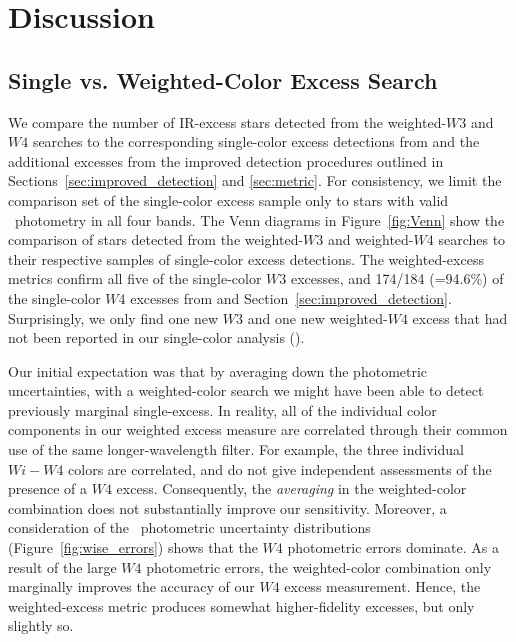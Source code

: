 \section{Discussion}
\label{sec:discussion}

\subsection{Single vs. Weighted-Color Excess Search}
\label{sec:single_v_multi}

    We compare the number of IR-excess stars detected from the weighted-$W3$ and $W4$ searches to the corresponding single-color excess detections from  and the additional excesses from the improved detection procedures outlined in Sections~\ref{sec:improved_detection} and \ref{sec:metric}. For consistency, we limit the comparison set of the single-color excess sample only to stars with valid \WS\ photometry in all four bands. The Venn diagrams in Figure~\ref{fig:Venn} show the comparison of stars detected from the weighted-$W3$ and weighted-$W4$ searches to their respective samples of single-color excess detections. The weighted-excess metrics confirm all five of the single-color $W3$ excesses, and 174/184 (=94.6\%) of the single-color $W4$ excesses from  and Section~\ref{sec:improved_detection}.  Surprisingly, we only find one new $W3$ and one new weighted-$W4$ excess that had not been reported in our single-color analysis (). 
    

    
    Our initial expectation was that by averaging down the photometric uncertainties, with a weighted-color search we might have been able to detect previously marginal single-excess. In reality, all of the individual color components in our weighted excess measure are correlated through their common use of the same longer-wavelength filter.  For example, the three individual $Wi-W4$ colors are correlated, and do not give independent assessments of the presence of a $W4$ excess. Consequently, the \textit{averaging} in the weighted-color combination does not substantially improve our sensitivity.  Moreover, a consideration of the \WS\ photometric uncertainty distributions (Figure~\ref{fig:wise_errors}) shows that the $W4$ photometric errors dominate. As a result of the large $W4$ photometric errors, the weighted-color combination only marginally improves the accuracy of our $W4$ excess measurement. Hence, the weighted-excess metric produces somewhat higher-fidelity excesses, but only slightly so.
   	
